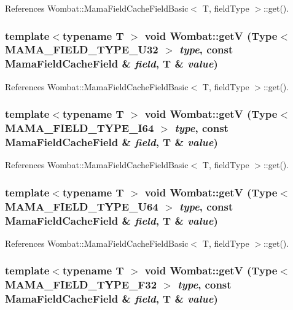 References Wombat::MamaFieldCacheFieldBasic$<$ T, fieldType $>$::get().\hypertarget{namespaceWombat_a5b31e8bb14f1f8dc2a169e99b58af05e}{
\subsubsection[{getV}]{\setlength{\rightskip}{0pt plus 5cm}template$<$typename T $>$ void Wombat::getV (Type$<$ MAMA\_\-FIELD\_\-TYPE\_\-U32 $>$ {\em type}, \/  const MamaFieldCacheField \& {\em field}, \/  T \& {\em value})}}
\label{namespaceWombat_a5b31e8bb14f1f8dc2a169e99b58af05e}


References Wombat::MamaFieldCacheFieldBasic$<$ T, fieldType $>$::get().\hypertarget{namespaceWombat_a33dce488b61562a36325d46730a0adb6}{
\subsubsection[{getV}]{\setlength{\rightskip}{0pt plus 5cm}template$<$typename T $>$ void Wombat::getV (Type$<$ MAMA\_\-FIELD\_\-TYPE\_\-I64 $>$ {\em type}, \/  const MamaFieldCacheField \& {\em field}, \/  T \& {\em value})}}
\label{namespaceWombat_a33dce488b61562a36325d46730a0adb6}


References Wombat::MamaFieldCacheFieldBasic$<$ T, fieldType $>$::get().\hypertarget{namespaceWombat_a8fe96dd711e344d221f74c7e1f8977e3}{
\subsubsection[{getV}]{\setlength{\rightskip}{0pt plus 5cm}template$<$typename T $>$ void Wombat::getV (Type$<$ MAMA\_\-FIELD\_\-TYPE\_\-U64 $>$ {\em type}, \/  const MamaFieldCacheField \& {\em field}, \/  T \& {\em value})}}
\label{namespaceWombat_a8fe96dd711e344d221f74c7e1f8977e3}


References Wombat::MamaFieldCacheFieldBasic$<$ T, fieldType $>$::get().\hypertarget{namespaceWombat_a9f981a37ecaaa2b2274f39b9bf8365ce}{
\subsubsection[{getV}]{\setlength{\rightskip}{0pt plus 5cm}template$<$typename T $>$ void Wombat::getV (Type$<$ MAMA\_\-FIELD\_\-TYPE\_\-F32 $>$ {\em type}, \/  const MamaFieldCacheField \& {\em field}, \/  T \& {\em value})}}
\label{namespaceWombat_a9f981a37ecaaa2b2274f39b9bf8365ce}


